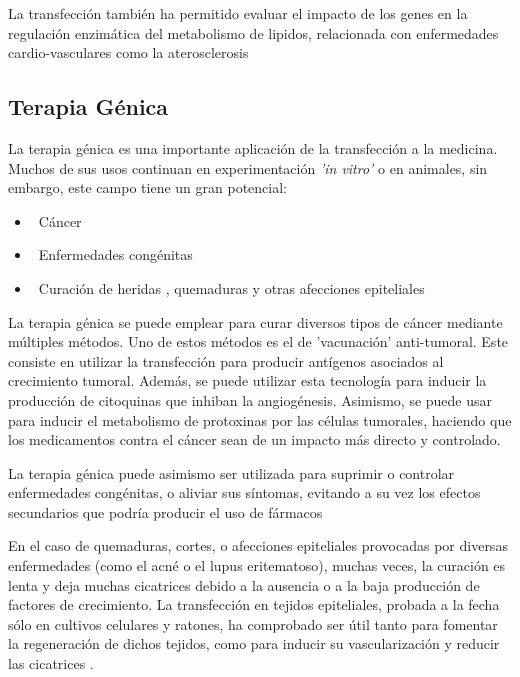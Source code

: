 \documentclass[fleqn,10pt]{SelfArx} %
\begin{document}
La transfección también ha permitido evaluar el impacto de los genes en la regulación enzimática del metabolismo de lipidos, relacionada con enfermedades cardio-vasculares como la aterosclerosis\cite{yanni2004laboratory}


\subsection{Terapia Génica}

La terapia génica es una importante aplicación de la transfección a la medicina. Muchos de sus usos continuan en experimentación \textit{'in vitro'} o en animales, sin embargo, este campo tiene un gran potencial:
\begin{itemize}[noitemsep] %
\item \ Cáncer
\item \ Enfermedades congénitas
\item \ Curación de heridas , quemaduras y otras afecciones epiteliales
\end{itemize}

La terapia génica se puede emplear para curar diversos tipos de cáncer mediante múltiples métodos. Uno de estos métodos es el de 'vacunación' anti-tumoral. Este consiste en utilizar la transfección para producir antígenos asociados al crecimiento tumoral. Además, se puede utilizar esta tecnología para inducir la producción de citoquinas que inhiban la angiogénesis. Asimismo, se puede usar para inducir el metabolismo de protoxinas por las células tumorales, haciendo que los medicamentos contra el cáncer sean de un impacto más directo y controlado\cite{Vile, Seung}.

La terapia génica puede asimismo ser utilizada para suprimir o controlar enfermedades congénitas, o aliviar sus síntomas, evitando a su vez los efectos secundarios que podría producir el uso de fármacos \cite{Spink}

En el caso de quemaduras, cortes, o afecciones epiteliales provocadas por diversas enfermedades (como el acné o el lupus eritematoso), muchas veces, la curación es lenta y deja muchas cicatrices debido a la ausencia o a la baja producción de factores de crecimiento. La transfección en tejidos epiteliales, probada a la fecha sólo en cultivos celulares y ratones, ha comprobado ser útil tanto para fomentar la regeneración de dichos tejidos, como para inducir su vascularización y reducir las cicatrices \cite{branskigene2006, Reinhart, strulovicihuman2007}.
\end{document}
